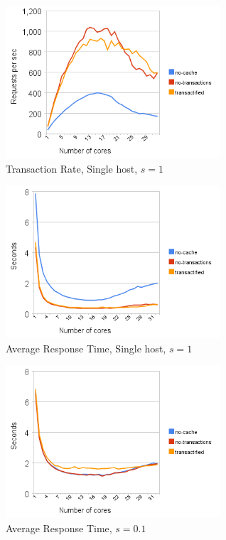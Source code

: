 \documentclass[preprint,natbib,11pt]{sigplanconf}
\begin{document}
\begin{figure}
 \begin{center}
  \includegraphics[width=8cm]{transaction-rate-single-host-1.png}
 \end{center}
 \caption{Transaction Rate, Single host, $s = 1$}
 \label{fig:transaction-rate-single-host-1}
\end{figure}
\begin{figure}
 \begin{center}
  \includegraphics[width=8cm]{response-time-single-host-1.png}
 \end{center}
 \caption{Average Response Time, Single host, $s = 1$}
 \label{fig:response-time-single-host-1}
\end{figure}
\begin{figure}
 \begin{center}
  \includegraphics[width=8cm]{response-time-client-server-0dot1.png}
 \end{center}
 \caption{Average Response Time, $s = 0.1$}
 \label{fig:response-time-0.1}
\end{figure}
\end{document}
